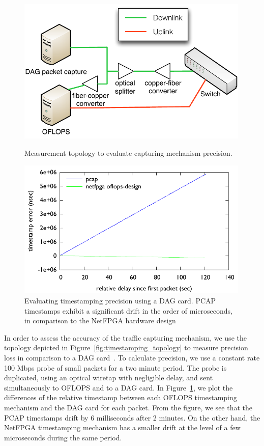 \begin{figure}
\centering
  \begin{minipage}[b]{0.45\textwidth}
\centering
 \includegraphics[width=0.99\textwidth]{accuracy-topology} 
 \caption{Measurement topology to evaluate capturing mechanism precision.}
\label{fig:timestamping_topology}
\end{minipage}
\hspace{0.5cm}
  \begin{minipage}[b]{0.45\textwidth}
\centering
 \includegraphics[width=0.99\textwidth]{timer_precision} 
 \caption{Evaluating timestamping precision using a DAG card. PCAP timestamps
   exhibit a significant drift in the order of microseconds, in comparison to
   the NetFPGA hardware design}
\label{fig:timestamping}
\end{minipage}
\end{figure}

In order to assess the accuracy of the traffic capturing mechanism, we use the
topology depicted in Figure~\ref{fig:timestamping_topology} to measure precision
loss in comparison to a DAG card~\cite{dag_card}.  To calculate precision, we
use a constant rate 100 Mbps probe of small packets for a two minute period. The
probe is duplicated, using an optical wiretap with negligible delay, and sent
simultaneously to OFLOPS and to a DAG card. In Figure~\ref{fig:timestamping}, we
plot the differences of the relative timestamp between each OFLOPS timestamping
mechanism and the DAG card for each packet. From the figure, we see that the
PCAP timestamps drift by 6 milliseconds after 2 minutes.  On the other hand, the
NetFPGA timestamping mechanism has a smaller drift at the level of a few
microseconds during the same period.

